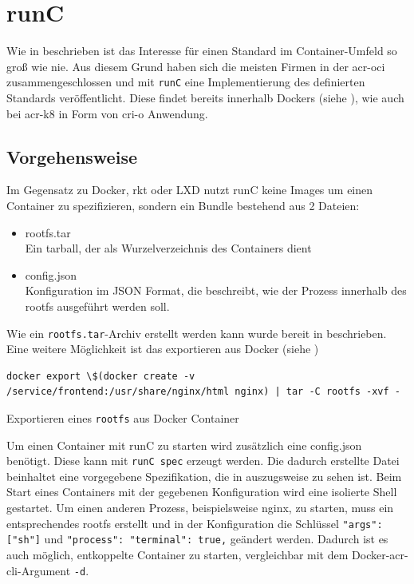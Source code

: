 \section{runC}
\label{sec:comprunC}

Wie in  beschrieben ist das Interesse für einen Standard im Container-Umfeld so groß wie nie. Aus diesem Grund haben sich die meisten Firmen in der \gls{acr-oci} zusammengeschlossen und mit \texttt{runC} eine Implementierung des definierten Standards veröffentlicht. Diese findet bereits innerhalb Dockers (siehe ), wie auch bei \gls{acr-k8} in Form von cri-o Anwendung.

\subsection{Vorgehensweise}
\label{sec:comprunCVorgehen}

Im Gegensatz zu Docker, rkt oder LXD nutzt runC keine Images um einen Container zu spezifizieren, sondern ein Bundle bestehend aus 2 Dateien:
\begin{itemize}
	\item rootfs.tar \\
	Ein tarball, der als Wurzelverzeichnis des Containers dient
	\item config.json \\
	Konfiguration im JSON Format, die beschreibt, wie der Prozess innerhalb des rootfs ausgeführt werden soll.
\end{itemize}

Wie ein \texttt{rootfs.tar}-Archiv erstellt werden kann wurde bereit in  beschrieben. Eine weitere Möglichkeit ist das exportieren aus Docker (siehe )

\begin{listing}[h]
	\begin{verbatim}
docker export \$(docker create -v /service/frontend:/usr/share/nginx/html nginx) | tar -C rootfs -xvf -
	\end{verbatim}
	\caption{Exportieren eines \texttt{rootfs} aus Docker Container}
	\label{lst:dockerExport}
\end{listing}

Um einen Container mit runC zu starten wird zusätzlich eine config.json benötigt. Diese kann mit \texttt{runC spec} erzeugt werden. Die dadurch erstellte Datei beinhaltet eine vorgegebene Spezifikation, die in  auszugsweise zu sehen ist. Beim Start eines Containers mit der gegebenen Konfiguration wird eine isolierte Shell gestartet. Um einen anderen Prozess, beispielsweise nginx, zu starten, muss ein entsprechendes rootfs erstellt und in der Konfiguration die Schlüssel \texttt{{"args": ["sh"]}} und \texttt{{"process": {"terminal": true,}}} geändert werden. Dadurch ist es auch möglich, entkoppelte Container zu starten, vergleichbar mit dem Docker-\gls{acr-cli}-Argument \texttt{-d}. 

